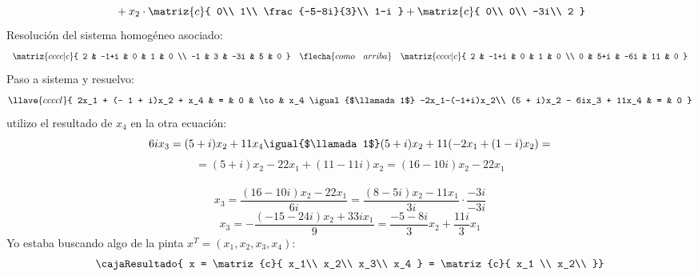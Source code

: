 \begin{enumerate}[label=(\alph*)]
$${{            }
            +
            x_2 \cdot
            \matriz{c}{
              0\\
              1\\
              \frac{-5-8i}{3}\\
              1-i
            }
            +
            \matriz{c}{
              0\\
              0\\
              -3i\\
              2
            }
          }
        $$
        Resolución del sistema homogéneo asociado:
        $$
          \begin{array}{ccc}
            \matriz{cccc|c}{
             2   &  -1+i  &  0    &   1   &   0        \\
            -1   &    3   & -3i   &   5   &   0
            }
              &
            \flecha{como \quad arriba}
              &
            \matriz{cccc|c}{
            2   &  -1+i    &    0   &   1    &  0         \\
            0   &   5+i    &   -6i  &   11   &  0
            }                                                    \\
          \end{array}
        $$
        Paso a sistema y resuelvo:
        $$
          \llave{ccccl}{
            2x_1  + (- 1 + i)x_2 + x_4  & = & 0 & \to & x_4 \igual{$\llamada1$} -2x_1-(-1+i)x_2\\
            (5 + i)x_2  - 6ix_3 + 11x_4  & = & 0  
          }
        $$
        utilizo el resultado de $x_4$ en la otra ecuación:
        $$
        6ix_3 = (5+i)x_2+11x_4 \igual{$\llamada1$} (5+i)x_2+11(-2x_1+(1-i)x_2)= 
        $$
        $$
        =(5+i)x_2-22x_1+(11-11i)x_2 = (16-10i)x_2-22x_1
        $$
        \\
        $$
        x_3 = \frac{(16-10i)x_2-22x_1}{6i} = \frac{(8-5i)x_2-11x_1}{3i} \cdot \frac{-3i}{-3i}
        $$
        $$
        x_3= -\frac{(-15-24i)x_2+33ix_1}{9} = \frac{-5-8i}{3}x_2 + \frac{11i}{3}x_1
        $$
        Yo estaba buscando algo de la pinta  $x^T = (x_1, x_2, x_3, x_4)$:
        $$
          \cajaResultado{
            x = \matriz{c}{
              x_1\\
              x_2\\
              x_3\\
              x_4
            }
            =
            \matriz{c}{
              x_1 \\
              x_2\\
}}$$
\end{enumerate}
